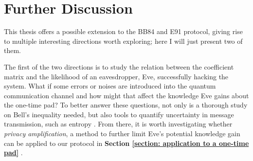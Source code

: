 
\chapter{Further Discussion} %

\label{Chapter7-further discussion} %

This thesis offers a possible extension to the BB84 and E91 protocol, giving rise to multiple interesting directions worth exploring; here I will just present two of them.

The first of the two directions is to study the relation between the coefficient matrix and the likelihood of an eavesdropper, Eve, successfully hacking the system. What if some errors or noises are introduced into the quantum communication channel and how might that affect the knowledge Eve gains about the one-time pad? To better answer these questions, not only is a thorough study on Bell's inequality \cite{bell1964} needed, but also tools to quantify uncertainty in message transmission, such as entropy \cite{renner2008security}. From there, it is worth investigating whether \textit{privacy amplification}, a method to further limit Eve's potential knowledge gain can be applied to our protocol in \textbf{Section \ref{section: application to a one-time pad}} \cite{bennett1995generalized}.

